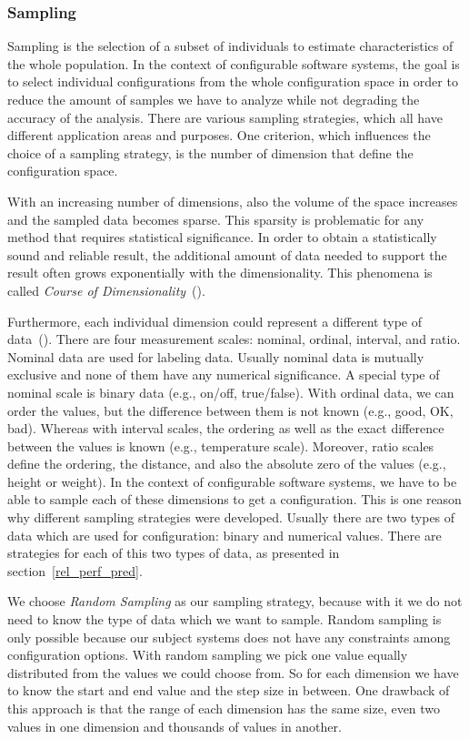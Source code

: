\subsubsection{Sampling}
\label{perf_measure_sampling}

Sampling is the selection of a subset of individuals to estimate characteristics of the whole population. In the context of configurable software systems, the goal is to select individual configurations from the whole configuration space in order to reduce the amount of samples we have to analyze while not degrading the accuracy of the analysis. There are various sampling strategies, which all have different application areas and purposes. One criterion, which influences the choice of a sampling strategy, is the number of dimension that define the configuration space. 

With an increasing number of dimensions, also the volume of the space increases and the sampled data becomes sparse. This sparsity is problematic for any method that requires statistical significance. In order to obtain a statistically sound and reliable result, the additional amount of data needed to support the result often grows exponentially with the dimensionality. This phenomena is called \textit{Course of Dimensionality}~(\cite{donoho2000high}).

Furthermore, each individual dimension could represent a different type of data~(\cite{stevens1946theory}). There are four measurement scales: nominal, ordinal, interval, and ratio. Nominal data are used for labeling data. Usually nominal data is mutually exclusive and none of them have any numerical significance. A special type of nominal scale is binary data (e.g., on/off, true/false). With ordinal data, we can order the values, but the difference between them is not known (e.g., good, OK, bad). Whereas with interval scales, the ordering as well as the exact difference between the values is known (e.g., temperature scale). Moreover, ratio scales define the ordering, the distance, and also the absolute zero of the values (e.g., height or weight). In the context of configurable software systems, we have to be able to sample each of these dimensions to get a configuration. This is one reason why different sampling strategies were developed. Usually there are two types of data which are used for configuration: binary and numerical values. There are strategies for each of this two types of data, as presented in section~\ref{rel_perf_pred}.

We choose \textit{Random Sampling} as our sampling strategy, because with it we do not need to know the type of data which we want to sample. Random sampling is only possible because our subject systems does not have any constraints among configuration options. With random sampling we pick one value equally distributed from the values we could choose from. So for each dimension we have to know the start and end value and the step size in between. One drawback of this approach is that the range of each dimension has the same size, even two values in one dimension and thousands of values in another. 


